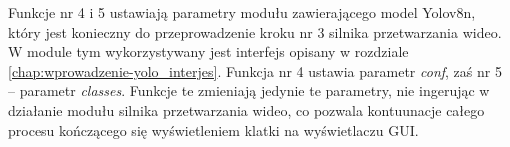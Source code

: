 Funkcje nr 4 i 5 ustawiają parametry modułu zawierającego model Yolov8n, który jest konieczny do przeprowadzenie kroku nr 3 silnika przetwarzania wideo. W module tym wykorzystywany jest interfejs opisany w rozdziale \ref{chap:wprowadzenie-yolo_interjes}. Funkcja nr 4 ustawia parametr \emph{conf}, zaś nr 5 -- parametr \emph{classes}. Funkcje te zmieniają jedynie te parametry, nie ingerując w działanie modułu silnika przetwarzania wideo, co pozwala kontuunacje całego procesu kończącego się wyświetleniem klatki na wyświetlaczu GUI.